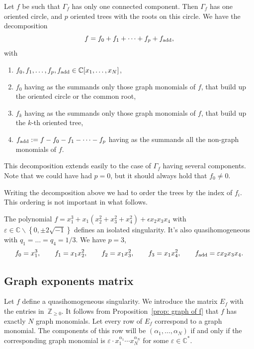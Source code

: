 \documentclass[pdftex]{sigma}
\numberwithin{equation}{section}
\newcommand{\CC}{{\mathbb{C}}}
\newcommand{\ZZ}{{\mathbb{Z}}}
\newcommand{\eps}{\varepsilon}
\begin{document}
Let $f$ be such that $\Gamma_f$ has only one connected component. Then $\Gamma_f$ has one oriented circle, and $p$ oriented trees with the roots on this circle.
We have the decomposition
\begin{equation}\label{eq: f decomposition}
	f = f_0 + f_1 + \dots + f_p + f_{\rm add},
\end{equation}
with
\begin{enumerate}\itemsep=0pt
 \item[(1)] $f_0,f_1,\dots,f_p, f_{\rm add} \in \CC[x_1,\dots,x_N]$,
 \item[(2)] $f_0$ having as the summands only those graph monomials of $f$, that build up the oriented circle or the common root,
 \item[(3)] $f_k$ having as the summands only those graph monomials of $f$, that build up the $k$-th oriented tree,
 \item[(4)] $f_{\rm add} := f - f_0 - f_1 -\dots - f_p$ having as the summands all the non-graph monomials of $f$.
\end{enumerate}
This decomposition extends easily to the case of $\Gamma_f$ having several components. Note that we could have had $p=0$, but it should always hold that $f_0 \neq 0$.

Writing the decomposition above we had to order the trees by the index of $f_i$. This ordering is not important in what follows.

\begin{Example}
	The polynomial $f = x_1^3 + x_1 \left(x_2^2+x_3^2+x_4^2\right) + \epsilon x_2 x_3 x_4 $ with $\eps \in \CC \backslash \left\lbrace 0, \pm 2 \sqrt{-1}\right\rbrace$ defines an isolated singularity. It's also quasihomogeneous with $q_1=\dots=q_4=1/3$.
	We have $p = 3$,
	\[
		f_0 = x_1^3, \qquad f_1 = x_1 x_2^2, \qquad f_2 = x_1 x_3^2, \qquad f_3 = x_1 x_4^2, \qquad f_{\rm add} = \eps x_2x_3x_4.
	\]
\end{Example}

\subsection{Graph exponents matrix}
Let $f$ define a quasihomogeneous singularity. We introduce the matrix $E_f$ with the entries in~$\ZZ_{\ge 0}$. It follows from Proposition~\ref{prop: graph of f} that $f$ has exactly $N$ graph monomials. Let every row of $E_f$ correspond to a graph monomial. The components of this row will be $(\alpha_1,\dots,\alpha_N)$ if and only if the corresponding graph monomial is $\eps \cdot x_1^{\alpha_1} \cdots x_N^{\alpha_N}$ for some $\eps \in \CC^\ast$.
\end{document}
